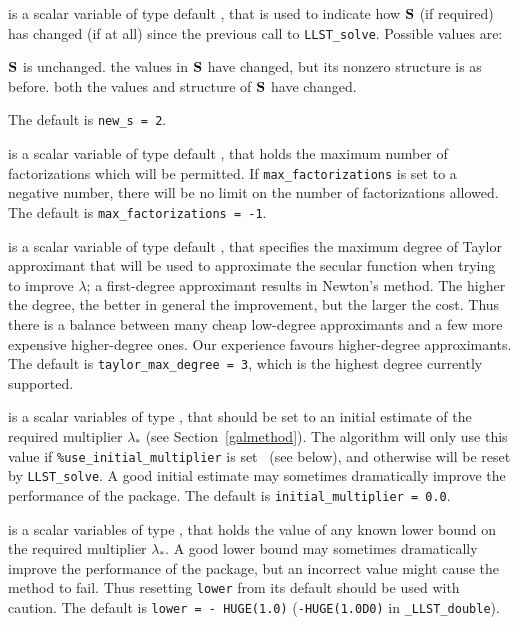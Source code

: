 \documentclass{galahad}
\newcommand{\packagename}{LLST}
\newcommand{\fullpackagename}{\libraryname\_\packagename}
\begin{document}
\begin{description}
 is a scalar variable of type default \integer, that is used
to indicate how ${\mathbf{S}}$ (if required) has changed (if at all) since the previous 
call to {\tt \packagename\_solve}. Possible values are:
\begin{description}
 ${\mathbf{S}}$ is unchanged.
 the values in ${\mathbf{S}}$ have changed, but its nonzero structure 
is as before.
 both the values and structure of ${\mathbf{S}}$ have changed.
\end{description}
The default is {\tt new\_s = 2}.

 is a scalar variable of type default \integer, 
that holds the maximum number of factorizations which will be permitted.
If {\tt max\_factorizations} is set to a negative number, there will be
no limit on the number of factorizations allowed.
The default is {\tt max\_factorizations = -1}.

 is a scalar variable of type default \integer, 
that specifies the maximum degree of Taylor approximant that will be used
to approximate the secular function when trying to improve $\lambda$;
a first-degree approximant results in Newton's method.
The higher the degree, the better in general the improvement, but the larger the
cost. Thus there is a balance between many cheap low-degree approximants
and a few more expensive higher-degree ones. Our experience favours 
higher-degree approximants.
The default is {\tt taylor\_max\_degree = 3}, which is the highest degree
currently supported.

 is a scalar variables of type \realdp, that should 
be set to an initial estimate of the required multiplier $\lambda_*$
(see Section~\ref{galmethod}). The algorithm will only use this value
if {\tt \%use\_initial\_multiplier} is set \true\ (see below), and otherwise 
will be reset by {\tt \packagename\_solve}. A good initial estimate 
may sometimes dramatically improve the performance of the package.
The default is {\tt initial\_multiplier = 0.0}.

 is a scalar variables of type \realdp, that holds the value
of any known lower bound on the required multiplier $\lambda_*$. A good lower
bound may sometimes dramatically improve the performance of the package, but
an incorrect value might cause the method to fail. Thus resetting
{\tt lower} from its default should be used with caution. 
The default is {\tt lower = - HUGE(1.0)}
({\tt -HUGE(1.0D0)} in {\tt \fullpackagename\_double}).


\end{description}
\end{document}
